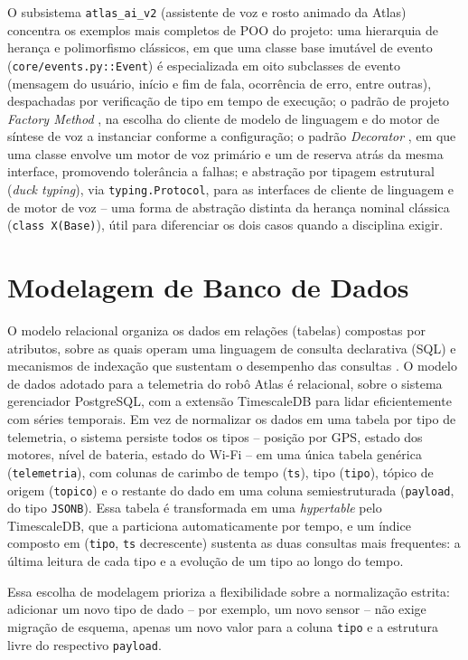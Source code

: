 O subsistema \texttt{atlas\_ai\_v2} (assistente de voz e rosto animado da Atlas) concentra os exemplos mais completos de POO do projeto: uma hierarquia de herança e polimorfismo clássicos, em que uma classe base imutável de evento (\texttt{core/events.py::Event}) é especializada em oito subclasses de evento (mensagem do usuário, início e fim de fala, ocorrência de erro, entre outras), despachadas por verificação de tipo em tempo de execução; o padrão de projeto \textit{Factory Method} \cite{gamma2000}, na escolha do cliente de modelo de linguagem e do motor de síntese de voz a instanciar conforme a configuração; o padrão \textit{Decorator} \cite{gamma2000}, em que uma classe envolve um motor de voz primário e um de reserva atrás da mesma interface, promovendo tolerância a falhas; e abstração por tipagem estrutural (\textit{duck typing}), via \texttt{typing.Protocol}, para as interfaces de cliente de linguagem e de motor de voz -- uma forma de abstração distinta da herança nominal clássica (\texttt{class X(Base)}), útil para diferenciar os dois casos quando a disciplina exigir.

\section{Modelagem de Banco de Dados} \label{sec:banco_dados}
O modelo relacional organiza os dados em relações (tabelas) compostas por atributos, sobre as quais operam uma linguagem de consulta declarativa (SQL) e mecanismos de indexação que sustentam o desempenho das consultas \cite{elmasri2011}. O modelo de dados adotado para a telemetria do robô Atlas é relacional, sobre o sistema gerenciador PostgreSQL, com a extensão TimescaleDB para lidar eficientemente com séries temporais. Em vez de normalizar os dados em uma tabela por tipo de telemetria, o sistema persiste todos os tipos -- posição por GPS, estado dos motores, nível de bateria, estado do Wi-Fi -- em uma única tabela genérica (\texttt{telemetria}), com colunas de carimbo de tempo (\texttt{ts}), tipo (\texttt{tipo}), tópico de origem (\texttt{topico}) e o restante do dado em uma coluna semiestruturada (\texttt{payload}, do tipo \texttt{JSONB}). Essa tabela é transformada em uma \textit{hypertable} pelo TimescaleDB, que a particiona automaticamente por tempo, e um índice composto em (\texttt{tipo}, \texttt{ts} decrescente) sustenta as duas consultas mais frequentes: a última leitura de cada tipo e a evolução de um tipo ao longo do tempo.

Essa escolha de modelagem prioriza a flexibilidade sobre a normalização estrita: adicionar um novo tipo de dado -- por exemplo, um novo sensor -- não exige migração de esquema, apenas um novo valor para a coluna \texttt{tipo} e a estrutura livre do respectivo \texttt{payload}.


